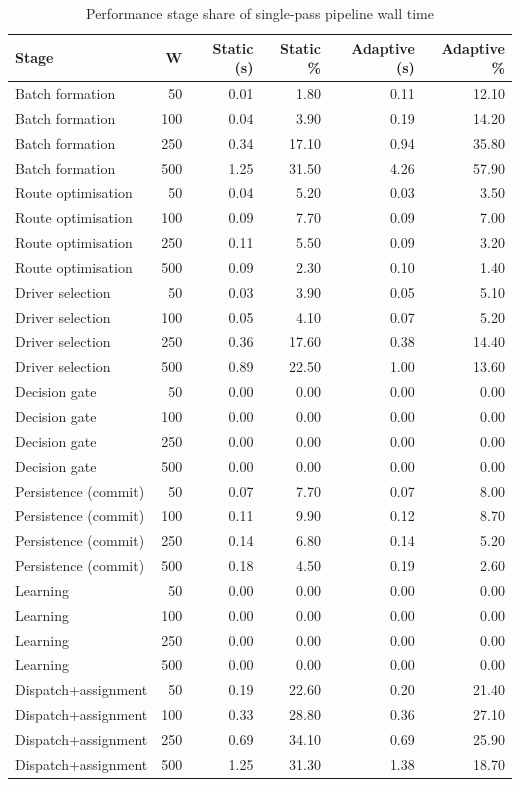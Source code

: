 \begin{table}[htbp]
\centering
\caption{Performance stage share of single-pass pipeline wall time}
\label{tab:admfe-stages}
\begin{tabular}{lrrrrr}
\toprule
Stage & W & Static (s) & Static \% & Adaptive (s) & Adaptive \% \\
\midrule
Batch formation & 50 & 0.01 & 1.80 & 0.11 & 12.10 \\
Batch formation & 100 & 0.04 & 3.90 & 0.19 & 14.20 \\
Batch formation & 250 & 0.34 & 17.10 & 0.94 & 35.80 \\
Batch formation & 500 & 1.25 & 31.50 & 4.26 & 57.90 \\
Route optimisation & 50 & 0.04 & 5.20 & 0.03 & 3.50 \\
Route optimisation & 100 & 0.09 & 7.70 & 0.09 & 7.00 \\
Route optimisation & 250 & 0.11 & 5.50 & 0.09 & 3.20 \\
Route optimisation & 500 & 0.09 & 2.30 & 0.10 & 1.40 \\
Driver selection & 50 & 0.03 & 3.90 & 0.05 & 5.10 \\
Driver selection & 100 & 0.05 & 4.10 & 0.07 & 5.20 \\
Driver selection & 250 & 0.36 & 17.60 & 0.38 & 14.40 \\
Driver selection & 500 & 0.89 & 22.50 & 1.00 & 13.60 \\
Decision gate & 50 & 0.00 & 0.00 & 0.00 & 0.00 \\
Decision gate & 100 & 0.00 & 0.00 & 0.00 & 0.00 \\
Decision gate & 250 & 0.00 & 0.00 & 0.00 & 0.00 \\
Decision gate & 500 & 0.00 & 0.00 & 0.00 & 0.00 \\
Persistence (commit) & 50 & 0.07 & 7.70 & 0.07 & 8.00 \\
Persistence (commit) & 100 & 0.11 & 9.90 & 0.12 & 8.70 \\
Persistence (commit) & 250 & 0.14 & 6.80 & 0.14 & 5.20 \\
Persistence (commit) & 500 & 0.18 & 4.50 & 0.19 & 2.60 \\
Learning & 50 & 0.00 & 0.00 & 0.00 & 0.00 \\
Learning & 100 & 0.00 & 0.00 & 0.00 & 0.00 \\
Learning & 250 & 0.00 & 0.00 & 0.00 & 0.00 \\
Learning & 500 & 0.00 & 0.00 & 0.00 & 0.00 \\
Dispatch+assignment & 50 & 0.19 & 22.60 & 0.20 & 21.40 \\
Dispatch+assignment & 100 & 0.33 & 28.80 & 0.36 & 27.10 \\
Dispatch+assignment & 250 & 0.69 & 34.10 & 0.69 & 25.90 \\
Dispatch+assignment & 500 & 1.25 & 31.30 & 1.38 & 18.70 \\
\bottomrule
\end{tabular}
\end{table}

